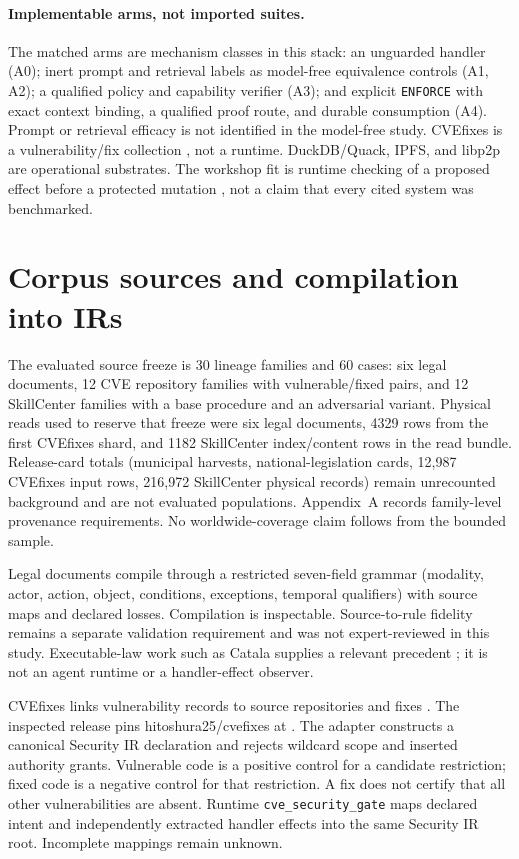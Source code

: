 \documentclass{article}
\begin{document}
\paragraph{Implementable arms, not imported suites.}
The matched arms are mechanism classes in this stack: an unguarded handler (A0); inert prompt and retrieval labels as model-free equivalence controls (A1, A2); a qualified policy and capability verifier (A3); and explicit \texttt{ENFORCE} with exact context binding, a qualified proof route, and durable consumption (A4). Prompt or retrieval efficacy is not identified in the model-free study. CVEfixes is a vulnerability/fix collection \citep{cvefixes}, not a runtime. DuckDB/Quack, IPFS, and libp2p \citep{quack,ipfs,libp2p} are operational substrates. The workshop fit is runtime checking of a proposed effect before a protected mutation \citep{vericode2026cfp}, not a claim that every cited system was benchmarked.

\section{Corpus sources and compilation into IRs}

The evaluated source freeze is 30 lineage families and 60 cases: six legal documents, 12 CVE repository families with vulnerable/fixed pairs, and 12 SkillCenter families with a base procedure and an adversarial variant. Physical reads used to reserve that freeze were six legal documents, 4329 rows from the first CVEfixes shard, and 1182 SkillCenter index/content rows in the read bundle. Release-card totals (municipal harvests, national-legislation cards, 12{,}987 CVEfixes input rows, 216{,}972 SkillCenter physical records) remain unrecounted background and are not evaluated populations. Appendix~A records family-level provenance requirements. No worldwide-coverage claim follows from the bounded sample.

Legal documents compile through a restricted seven-field grammar (modality, actor, action, object, conditions, exceptions, temporal qualifiers) with source maps and declared losses. Compilation is inspectable. Source-to-rule fidelity remains a separate validation requirement and was not expert-reviewed in this study. Executable-law work such as Catala supplies a relevant precedent \citep{catala}; it is not an agent runtime or a handler-effect observer.

CVEfixes links vulnerability records to source repositories and fixes \citep{cvefixes}. The inspected release pins hitoshura25/cvefixes at . The adapter constructs a canonical Security IR declaration and rejects wildcard scope and inserted authority grants. Vulnerable code is a positive control for a candidate restriction; fixed code is a negative control for that restriction. A fix does not certify that all other vulnerabilities are absent. Runtime \texttt{cve\_security\_gate} maps declared intent and independently extracted handler effects into the same Security IR root. Incomplete mappings remain unknown.
\end{document}
